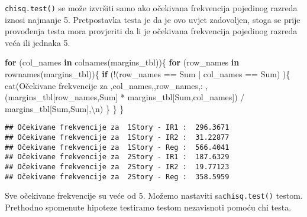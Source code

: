 \documentclass[
]{article}
\newenvironment{Shaded}{\begin{snugshade}}{\end{snugshade}}
\newcommand{\ControlFlowTok}[1]{\textcolor[rgb]{0.13,0.29,0.53}{\textbf{#1}}}
\newcommand{\FunctionTok}[1]{\textcolor[rgb]{0.00,0.00,0.00}{#1}}
\newcommand{\NormalTok}[1]{#1}
\newcommand{\SpecialCharTok}[1]{\textcolor[rgb]{0.00,0.00,0.00}{#1}}
\newcommand{\StringTok}[1]{\textcolor[rgb]{0.31,0.60,0.02}{#1}}
\begin{document}
\texttt{chisq.test()} se može izvršiti samo ako očekivana frekvencija
pojedinog razreda iznosi najmanje 5. Pretpostavka testa je da je ovo
uvjet zadovoljen, stoga se prije provođenja testa mora provjeriti da li
je očekivana frekvencija pojedinog razreda veća ili jednaka 5.

\begin{Shaded}
\begin{Highlighting}[]
\ControlFlowTok{for}\NormalTok{ (col\_names }\ControlFlowTok{in} \FunctionTok{colnames}\NormalTok{(margins\_tbl))\{}
  \ControlFlowTok{for}\NormalTok{ (row\_names }\ControlFlowTok{in} \FunctionTok{rownames}\NormalTok{(margins\_tbl))\{}
    \ControlFlowTok{if}\NormalTok{ (}\SpecialCharTok{!}\NormalTok{(row\_names }\SpecialCharTok{==} \StringTok{\textquotesingle{}Sum\textquotesingle{}} \SpecialCharTok{|}\NormalTok{ col\_names }\SpecialCharTok{==} \StringTok{\textquotesingle{}Sum\textquotesingle{}}\NormalTok{) )\{}
      \FunctionTok{cat}\NormalTok{(}\StringTok{\textquotesingle{}Očekivane frekvencije za \textquotesingle{}}\NormalTok{,col\_names,}\StringTok{\textquotesingle{}{-}\textquotesingle{}}\NormalTok{,row\_names,}\StringTok{\textquotesingle{}: \textquotesingle{}}\NormalTok{,(margins\_tbl[row\_names,}\StringTok{\textquotesingle{}Sum\textquotesingle{}}\NormalTok{] }\SpecialCharTok{*}\NormalTok{ margins\_tbl[}\StringTok{\textquotesingle{}Sum\textquotesingle{}}\NormalTok{,col\_names]) }\SpecialCharTok{/}\NormalTok{ margins\_tbl[}\StringTok{\textquotesingle{}Sum\textquotesingle{}}\NormalTok{,}\StringTok{\textquotesingle{}Sum\textquotesingle{}}\NormalTok{],}\StringTok{\textquotesingle{}}\SpecialCharTok{\textbackslash{}n}\StringTok{\textquotesingle{}}\NormalTok{)}
\NormalTok{    \}}
\NormalTok{  \}}
\NormalTok{\}}
\end{Highlighting}
\end{Shaded}

\begin{verbatim}
## Očekivane frekvencije za  1Story - IR1 :  296.3671 
## Očekivane frekvencije za  1Story - IR2 :  31.22877 
## Očekivane frekvencije za  1Story - Reg :  566.4041 
## Očekivane frekvencije za  2Story - IR1 :  187.6329 
## Očekivane frekvencije za  2Story - IR2 :  19.77123 
## Očekivane frekvencije za  2Story - Reg :  358.5959
\end{verbatim}

Sve očekivane frekvencije su veće od 5. Možemo nastaviti
sa\texttt{chisq.test()} testom. Prethodno spomenute hipoteze testiramo
testom nezavisnoti pomoću chi testa.
\end{document}
